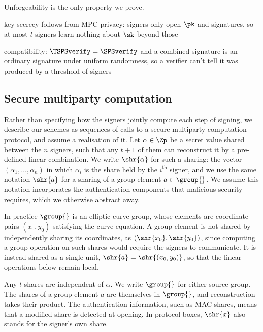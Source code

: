 Unforgeability is the only property we prove.

\begin{outline}
  \item key secrecy follows from MPC privacy: signers only open $\pk$ and
signatures, so at most $t$ signers learn nothing about $\sk$ beyond those
  \item compatibility: $\TSPSverify = \SPSverify$ and a combined signature is an
ordinary signature under uniform randomness, so a verifier can't tell it was
produced by a threshold of signers
\end{outline}

\subsection{Secure multiparty computation}\label{sec:tsps-mpc}

Rather than specifying how the signers jointly compute each step of signing, we
describe our schemes as sequences of calls to a secure multiparty computation
protocol, and assume a realisation of it. Let $\alpha \in \Zp$ be a secret value
shared between the $n$ signers, such that any $t+1$ of them can reconstruct it
by a pre-defined linear combination. We write $\shr{\alpha}$ for such a sharing:
the vector $(\alpha_1, \ldots, \alpha_n)$ in which $\alpha_i$ is the share held
by the $i^{\mathrm{th}}$ signer, and we use the same notation $\shr{a}$ for a
sharing of a group element $a \in \group{}$. We assume this notation
incorporates the authentication components that malicious security requires,
which we otherwise abstract away.

In practice $\group{}$ is an elliptic curve group, whose elements are coordinate
pairs $(x_0, y_0)$ satisfying the curve equation. A group element is not shared
by independently sharing its coordinates, as $(\shr{x_0}, \shr{y_0})$, since
computing a group operation on such shares would require the signers to
communicate. It is instead shared as a single unit, $\shr{a} = \shr{(x_0,
y_0)}$, so that the linear operations below remain local.

Any $t$ shares are independent of $\alpha$. We write $\group{}$ for either
source group. The shares of a group element $a$ are themselves in $\group{}$,
and reconstruction takes their product. The authentication information, such as
MAC shares, means that a modified share is detected at opening. In protocol
boxes, $\shr{x}$ also stands for the signer's own share.

